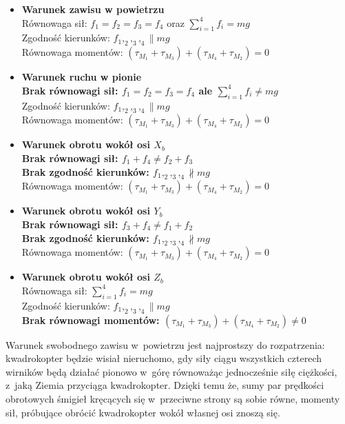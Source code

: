 \documentclass[11pt, twoside]{Thesis} %
\begin{document}
\begin{itemize}
	\item \textbf{Warunek zawisu w powietrzu}\\ Równowaga sił: $f_1 = f_2 = f_3 = f_4$ oraz $\sum_{i=1}^{4} f_i = mg$ \\ Zgodność kierunków: $f_1,_2,_3,_4 \parallel mg$ \\Równowaga momentów: $(\tau_{M_1} + \tau_{M_3}) + (\tau_{M_4} + \tau_{M_2}) = 0$ 
	\item \textbf{Warunek ruchu w pionie} \\ \textbf{Brak równowagi sił: $f_1 = f_2 = f_3 = f_4$ ale  $\sum_{i=1}^{4} f_i \neq mg$} \\ Zgodność kierunków: $f_1,_2,_3,_4 \parallel mg$ \\ Równowaga momentów: $(\tau_{M_1} + \tau_{M_3}) + (\tau_{M_4} + \tau_{M_2}) = 0$  
	\item \textbf{Warunek obrotu wokół osi $X_b$} \\ \textbf{Brak równowagi sił: $f_1 + f_4 \neq f_2 + f_3 $} \\ \textbf{Brak zgodność kierunków: $f_1,_2,_3,_4 \not\parallel mg$} \\ Równowaga momentów: $(\tau_{M_1} + \tau_{M_3}) + (\tau_{M_4} + \tau_{M_2}) = 0$ \\ 
	\item \textbf{Warunek obrotu wokół osi $Y_b$} \\ \textbf{Brak równowagi sił: $f_3 + f_4 \neq f_1 + f_2$} \\ \textbf{Brak zgodność kierunków: $f_1,_2,_3,_4 \not\parallel mg$} \\ Równowaga momentów: $(\tau_{M_1} + \tau_{M_3}) + (\tau_{M_4} + \tau_{M_2}) = 0$ \\
	\item \textbf{Warunek obrotu wokół osi $Z_b$} \\ Równowaga sił: $\sum_{i=1}^{4} f_i = mg$ \\ Zgodność kierunków: $f_1,_2,_3,_4 \parallel mg$ \\ \textbf{Brak równowagi momentów: $(\tau_{M_1} + \tau_{M_3}) + (\tau_{M_4} + \tau_{M_2}) \neq 0 $}\\ 

\end{itemize}

Warunek swobodnego zawisu w~powietrzu jest najprostszy do rozpatrzenia: kwadrokopter będzie wisiał nieruchomo, gdy siły ciągu wszystkich czterech wirników będą działać pionowo w~górę równoważąc jednocześnie siłę ciężkości, z~jaką Ziemia przyciąga kwadrokopter. Dzięki temu że, sumy par prędkości obrotowych śmigieł kręcących się w~przeciwne strony są sobie równe, momenty sił, próbujące obrócić kwadrokopter wokół własnej osi znoszą się.
\end{document}
